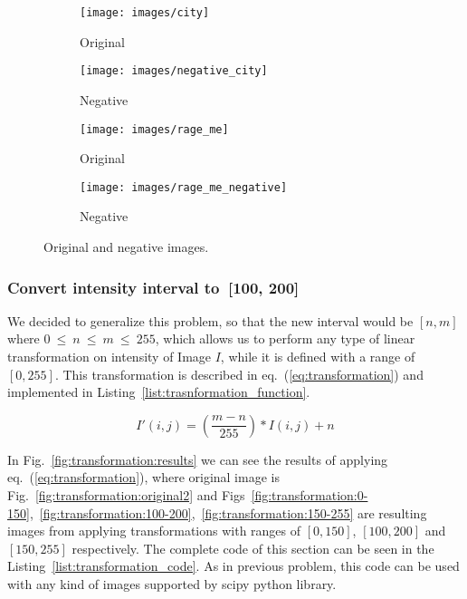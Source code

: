 \documentclass[journal]{IEEEtran}
\begin{document}
\begin{figure}[t]
	\centering
	\begin{subfigure}{0.23\textwidth}
		\centering
		\texttt{[image: images/city]} 
		\caption{Original}
		\label{fig:transformation:original}
	\end{subfigure}
	\centering
	\begin{subfigure}{0.23\textwidth}
		\centering
		\texttt{[image: images/negative\_city]}
		\caption{Negative}
		\label{fig:transformation:negative_}
	\end{subfigure}
	\centering
	\begin{subfigure}{0.23\textwidth}
		\centering
		\texttt{[image: images/rage\_me]} 
		\caption{Original}
		\label{fig:transformation:me_original}
	\end{subfigure}
	\centering
	\begin{subfigure}{0.23\textwidth}
		\centering
		\texttt{[image: images/rage\_me\_negative]}
		\caption{Negative}
		\label{fig:transformation:me_negative}
	\end{subfigure}

	\caption{Original and negative images.}
	\label{fig:transformation:negative}
\end{figure}


\subsubsection{Convert intensity interval to~[100, 200]}
We decided to generalize this problem, so that the new interval would be $[n, m]$ where $0~\leq~n~\leq~m~\leq~255$, which allows us to perform any type of linear transformation on intensity of Image $I$, while it is defined with a range of $[0, 255]$. This transformation is described in eq.~(\ref{eq:transformation}) and implemented in Listing~\ref{list:trasnformation_function}.

\begin{equation}\label{eq:transformation}
I'(i,j) = \left(\dfrac{m - n}{255}\right) * I(i,j) + n
\end{equation}

In Fig.~\ref{fig:transformation:results} we can see the results of applying eq.~(\ref{eq:transformation}), where original image is Fig.~\ref{fig:transformation:original2} and Figs~\ref{fig:transformation:0-150},~\ref{fig:transformation:100-200},~\ref{fig:transformation:150-255}  are resulting images from applying transformations with ranges of $[0,150]$, $[100,200]$ and $[150, 255]$ respectively. The complete code of this section can be seen in the Listing~\ref{list:transformation_code}.
As in previous problem, this code can be used with any kind of images supported by scipy python library.
\end{document}
